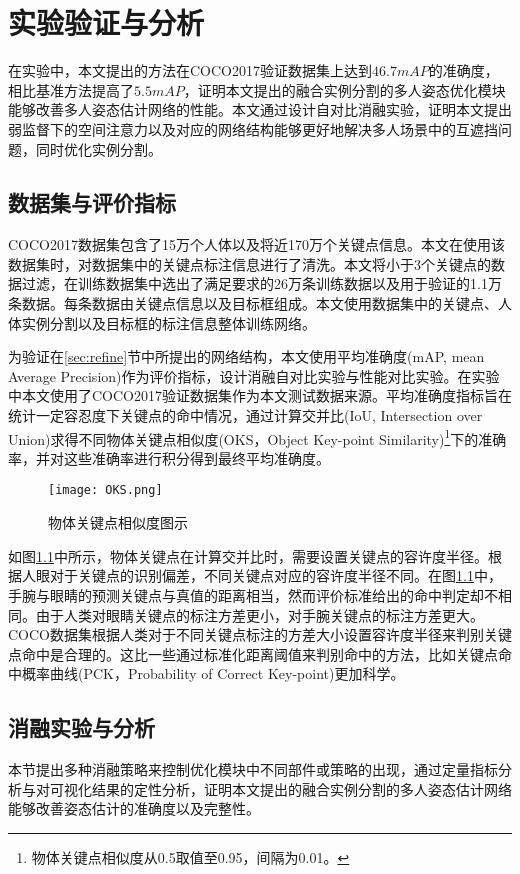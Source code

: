 \chapter{实验验证与分析}
\label{cha:exp}
在实验中，本文提出的方法在COCO2017\cite{lin2014microsoft}验证数据集上达到$46.7mAP$的准确度，相比基准方法提高了$5.5mAP$，证明本文提出的融合实例分割的多人姿态优化模块能够改善多人姿态估计网络的性能。本文通过设计自对比消融实验，证明本文提出弱监督下的空间注意力以及对应的网络结构能够更好地解决多人场景中的互遮挡问题，同时优化实例分割。
\section{数据集与评价指标}
\label{sec:dataset}
COCO2017数据集\cite{lin2014microsoft}包含了15万个人体以及将近170万个关键点信息。本文在使用该数据集时，对数据集中的关键点标注信息进行了清洗。本文将小于3个关键点的数据过滤，在训练数据集中选出了满足要求的26万条训练数据以及用于验证的1.1万条数据。每条数据由关键点信息以及目标框组成。本文使用数据集中的关键点、人体实例分割以及目标框的标注信息整体训练网络。

为验证在\ref{sec:refine}节中所提出的网络结构，本文使用平均准确度(mAP, mean Average Precision)\cite{zhu2004recall}作为评价指标，设计消融自对比实验与性能对比实验。在实验中本文使用了COCO2017验证数据集作为本文测试数据来源。平均准确度指标旨在统计一定容忍度下关键点的命中情况，通过计算交并比(IoU, Intersection over Union)求得不同物体关键点相似度(OKS，Object Key-point Similarity)\footnote{物体关键点相似度从0.5取值至0.95，间隔为0.01。}下的准确率，并对这些准确率进行积分得到最终平均准确度\cite{ruggero2017benchmarking}。

\begin{figure}
	\centering
	\texttt{[image: OKS.png]}
	\caption{物体关键点相似度图示\cite{ruggero2017benchmarking}}
	\label{fig:oksfigure}
\end{figure}

如图\ref{fig:oksfigure}中所示，物体关键点在计算交并比时，需要设置关键点的容许度半径。根据人眼对于关键点的识别偏差，不同关键点对应的容许度半径不同。在图\ref{fig:oksfigure}中，手腕与眼睛的预测关键点与真值的距离相当，然而评价标准给出的命中判定却不相同。由于人类对眼睛关键点的标注方差更小，对手腕关键点的标注方差更大。COCO数据集根据人类对于不同关键点标注的方差大小设置容许度半径来判别关键点命中是合理的。这比一些通过标准化距离阈值来判别命中的方法，比如关键点命中概率曲线\cite{andriluka20142d}(PCK，Probability of Correct Key-point)更加科学。

\section{消融实验与分析}
\label{sec:ablation}
本节提出多种消融策略来控制优化模块中不同部件或策略的出现，通过定量指标分析与对可视化结果的定性分析，证明本文提出的融合实例分割的多人姿态估计网络能够改善姿态估计的准确度以及完整性。
